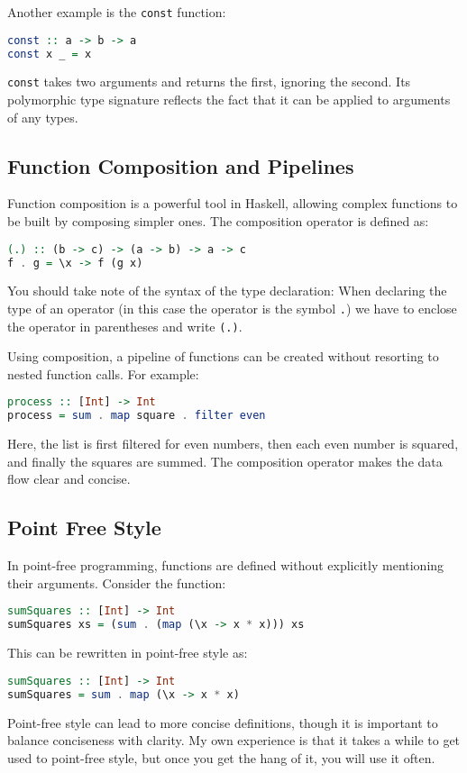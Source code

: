 Another example is the \texttt{const} function:
\begin{lstlisting}[style=haskellstyle, language=Haskell]
const :: a -> b -> a
const x _ = x
\end{lstlisting}
\texttt{const} takes two arguments and returns the first, ignoring the second. Its polymorphic type signature reflects the fact that it can be applied to arguments of any types.

\subsection{Function Composition and Pipelines}
Function composition is a powerful tool in Haskell, allowing complex functions to be built by composing simpler ones. The composition operator is defined as:
\begin{lstlisting}[style=haskellstyle, language=Haskell]
(.) :: (b -> c) -> (a -> b) -> a -> c
f . g = \x -> f (g x)
\end{lstlisting}
You should take note of the syntax of the type declaration:  When declaring the type of an operator (in this
case the operator is the symbol \texttt{.}) we have to enclose the operator in parentheses and write \texttt{(.)}.

Using composition, a pipeline of functions can be created without resorting to nested function calls. For example:
\begin{lstlisting}[style=haskellstyle, language=Haskell]
process :: [Int] -> Int
process = sum . map square . filter even
\end{lstlisting}
Here, the list is first filtered for even numbers, then each even number is squared, and finally the squares are summed. The composition operator makes the data flow clear and concise.

\subsection{Point Free Style}
In point-free programming, functions are defined without explicitly mentioning their arguments. Consider the function:
\begin{lstlisting}[style=haskellstyle, language=Haskell]
sumSquares :: [Int] -> Int
sumSquares xs = (sum . (map (\x -> x * x))) xs
\end{lstlisting}
This can be rewritten in point-free style as:
\begin{lstlisting}[style=haskellstyle, language=Haskell]
sumSquares :: [Int] -> Int
sumSquares = sum . map (\x -> x * x)
\end{lstlisting}
Point-free style can lead to more concise definitions, though it is important to balance conciseness with
clarity.  My own experience is that it takes a while to get used to point-free style, but once you get the hang
of it, you will use it often.

